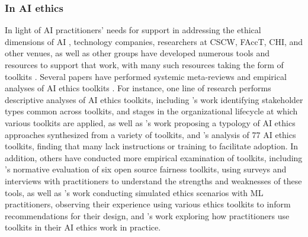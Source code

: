 \documentclass[acmsmall]{acmart}
\begin{document}
\subsubsection{In AI ethics}

In light of AI practitioners' needs for support in addressing the ethical dimensions of AI \cite{Holstein:2019fr}, technology companies, researchers at CSCW, FAccT, CHI, and other venues, as well as other groups have developed numerous tools and resources to support that work, with many such resources taking the form of toolkits \cite[e.g.,][]{lee2021landscape,richardson2021towards,morley2021initial,10.1145/3442188.3445938,shen2021valuecards,gebru2021datasheets,mitchell2019model,deng2022exploring, shen2022model}. %
Several papers have performed systemic meta-reviews and empirical analyses of AI ethics toolkits \cite{lee2021landscape,morley2021initial,richardson2021towards,ayling2021putting,deng2022exploring}. For instance, one line of research performs descriptive analyses of AI ethics toolkits, including \citet{ayling2021putting}'s work identifying stakeholder types common across toolkits, and stages in the organizational lifecycle at which various toolkits are applied, as well as \citet{morley2021initial}'s work proposing a typology of AI ethics approaches synthesized from a variety of toolkits, and \citet{Crockett2021BuildingTrustworthy}'s analysis of 77 AI ethics toolkits, finding that many lack instructions or training to facilitate adoption. %
In addition, others have conducted more empirical examination of toolkits, including \citet{lee2021landscape}'s normative evaluation of six open source fairness toolkits, using surveys and interviews with practitioners to understand the strengths and weaknesses of these tools, as well as \citet{richardson2021towards}'s work conducting simulated ethics scenarios with ML practitioners, observing their experience using various ethics toolkits to inform recommendations for their design, and \citet{deng2022exploring}'s work exploring how practitioners use toolkits in their AI ethics work in practice. 
\end{document}
